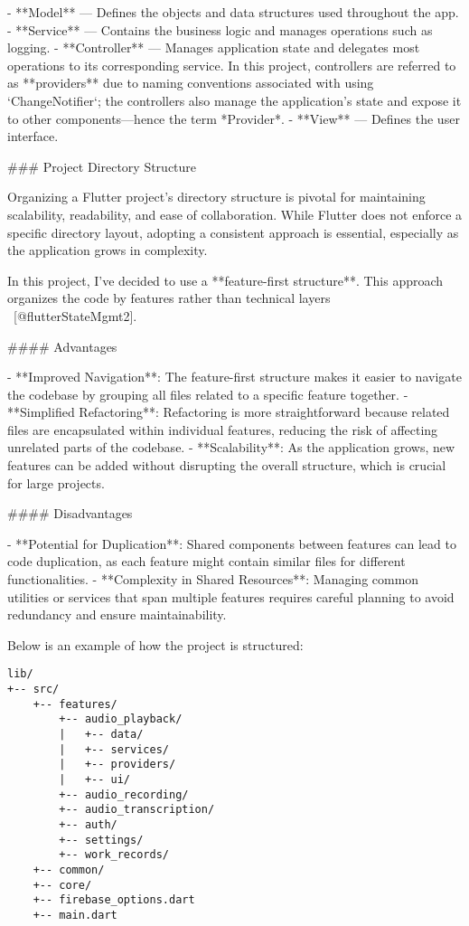 \documentclass[
  digital,     %
  oneside,     %
  nosansbold,  %
  nocolorbold, %
  lof,         %
  lot,         %
]{fithesis4}
\begin{document}
\begin{markdown}
- **Model** — Defines the objects and data structures used throughout the app.
- **Service** — Contains the business logic and manages operations such as logging.
- **Controller** — Manages application state and delegates most operations to its corresponding service. In this project, controllers are referred to as **providers** due to naming conventions associated with using `ChangeNotifier`; the controllers also manage the application's state and expose it to other components—hence the term *Provider*.
- **View** — Defines the user interface.

### Project Directory Structure

Organizing a Flutter project's directory structure is pivotal for maintaining scalability, readability, and ease of collaboration. While Flutter does not enforce a specific directory layout, adopting a consistent approach is essential, especially as the application grows in complexity.

In this project, I've decided to use a **feature-first structure**. This approach organizes the code by features rather than technical layers ~[@flutterStateMgmt2].

#### Advantages

- **Improved Navigation**: The feature-first structure makes it easier to navigate the codebase by grouping all files related to a specific feature together.
- **Simplified Refactoring**: Refactoring is more straightforward because related files are encapsulated within individual features, reducing the risk of affecting unrelated parts of the codebase.
- **Scalability**: As the application grows, new features can be added without disrupting the overall structure, which is crucial for large projects.

#### Disadvantages

- **Potential for Duplication**: Shared components between features can lead to code duplication, as each feature might contain similar files for different functionalities.
- **Complexity in Shared Resources**: Managing common utilities or services that span multiple features requires careful planning to avoid redundancy and ensure maintainability.

Below is an example of how the project is structured:

\end{markdown}
\begin{verbatim}
lib/
+-- src/
    +-- features/
        +-- audio_playback/
        |   +-- data/
        |   +-- services/
        |   +-- providers/
        |   +-- ui/
        +-- audio_recording/
        +-- audio_transcription/
        +-- auth/
        +-- settings/
        +-- work_records/
    +-- common/
    +-- core/
    +-- firebase_options.dart
    +-- main.dart
\end{verbatim}
\end{document}

